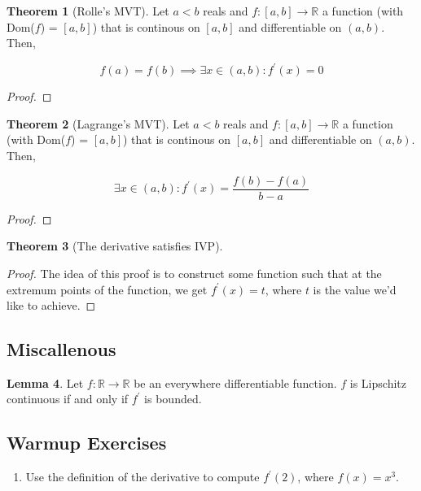 \documentclass{article}
\theoremstyle{definition}
\newtheorem{theorem}{Theorem}[section]
\newtheorem{lemma}[theorem]{Lemma}
\newcommand{\R}{\mathbb{R}}
\begin{document}
\begin{theorem}[Rolle's MVT]\label{rolle_mvt}
    Let $a < b$ reals and $f: [a,b] \xrightarrow{} \R$ a function (with Dom($f$) = $[a,b]$)
    that is continous on $[a,b]$ and differentiable on $(a,b)$. Then,

    \[ f(a) = f(b) \implies \exists x \in (a,b): f^{\prime}(x) = 0\]
\end{theorem}
\begin{proof}
    
\end{proof}

\begin{theorem}[Lagrange's MVT]\label{lagrange_mvt}
    Let $a < b$ reals and $f: [a,b] \xrightarrow{} \R$ a function (with Dom($f$) = $[a,b]$)
    that is continous on $[a,b]$ and differentiable on $(a,b)$. Then,

    \[ \exists x \in (a,b): f^{\prime}(x) = \frac{f(b) - f(a)}{b-a}\]
\end{theorem}
\begin{proof}
    
\end{proof}

\begin{theorem}[The derivative satisfies IVP]
    
\end{theorem}
\begin{proof}
    The idea of this proof is to construct some function such that
    at the extremum points of the function, we get $f^{\prime}(x) = t$,
    where $t$ is the value we'd like to achieve.
\end{proof}

\subsection{Miscallenous}

\begin{lemma}
    Let $f: \R \xrightarrow{} \R$ be an everywhere differentiable function.
    $f$ is Lipschitz continuous if and only if $f^{\prime}$ is bounded.
\end{lemma}

\subsection{Warmup Exercises}

\begin{enumerate}
    \item Use the definition of the derivative to compute $f^{\prime}(2)$, where $f(x)= x^{3}$.
\end{enumerate}
\end{document}
